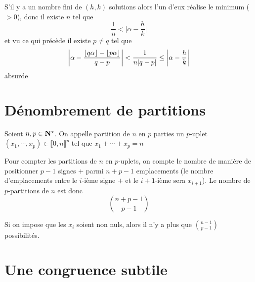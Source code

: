S'il y a un nombre fini de $(h, k)$ solutions alors l'un d'eux réalise le minimum ($>0$), donc il existe $n$ tel que \[
    \frac1n<\Big|\alpha-\frac hk\Big|
\]
et vu ce qui précède il existe $p\neq q$ tel que \[
    \left| \alpha-\frac{\left\lfloor q\alpha\right\rfloor-\left\lfloor p\alpha\right\rfloor}{q-p} \right|<\frac1{n|q-p|}\leq \left| \alpha-\frac hk \right|
\]
absurde

\section{Dénombrement de partitions}

Soient $n, p\in\mathbf N^\star$. On appelle partition de $n$ en $p$ parties un $p$-uplet $(x_1, \cdots, x_p)\in\llbracket 0, n\rrbracket ^p$ tel que $x_1+\cdots +x_p=n$

Pour compter les partitions de $n$ en $p$-uplets, on compte le nombre de manière de positionner $p-1$ signes $+$ parmi $n+p-1$ emplacements (le nombre d'emplacements entre le $i$-ième signe $+$ et le $i+1$-ième sera $x_{i+1}$). Le nombre de $p$-partitions de $n$ est donc \[
    \binom{n+p-1}{p-1}
\]

Si on impose que les $x_i$ soient non nuls, alors il n'y a plus que $\displaystyle\binom{n-1}{p-1}$ possibilités.

\section{Une congruence subtile}

